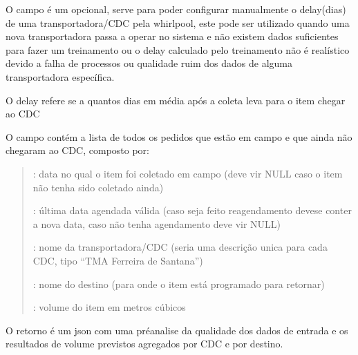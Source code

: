 \documentclass[letterpaper,10pt,english]{sphinxmanual}
\begin{document}
\sphinxAtStartPar
O campo  é um opcional, serve para poder configurar
manualmente o delay(dias) de uma transportadora/CDC pela whirlpool,
este pode ser utilizado quando uma nova transportadora passa
a operar no sistema e não existem dados suficientes para
fazer um treinamento ou o delay calculado pelo treinamento
não é realístico devido a falha de processos ou qualidade ruim
dos dados de alguma transportadora específica.

\sphinxAtStartPar
O delay  refere se a quantos dias em média após a coleta leva para o item chegar ao CDC

\sphinxAtStartPar
O campo  contém a lista de todos os pedidos que estão
em campo e que ainda não chegaram ao CDC, composto por:
\begin{quote}

\sphinxAtStartPar
{}: data no qual o item foi coletado em campo (deve vir NULL caso o item não tenha sido coletado ainda)

\sphinxAtStartPar
{}: última data agendada válida (caso seja feito reagendamento deve\sphinxhyphen{}se conter a nova data, caso não tenha agendamento deve vir NULL)

\sphinxAtStartPar
{}: nome da transportadora/CDC   (seria uma descrição unica para cada CDC, tipo “TMA Ferreira de Santana”)

\sphinxAtStartPar
{}: nome do destino (para onde o item está programado para retornar)

\sphinxAtStartPar
{}: volume do item em metros cúbicos
\end{quote}

\sphinxAtStartPar
{}

\sphinxAtStartPar
O retorno é um json com uma pré\sphinxhyphen{}analise da qualidade dos
dados de entrada e os resultados de volume previstos agregados
por CDC e por destino.
\end{document}
